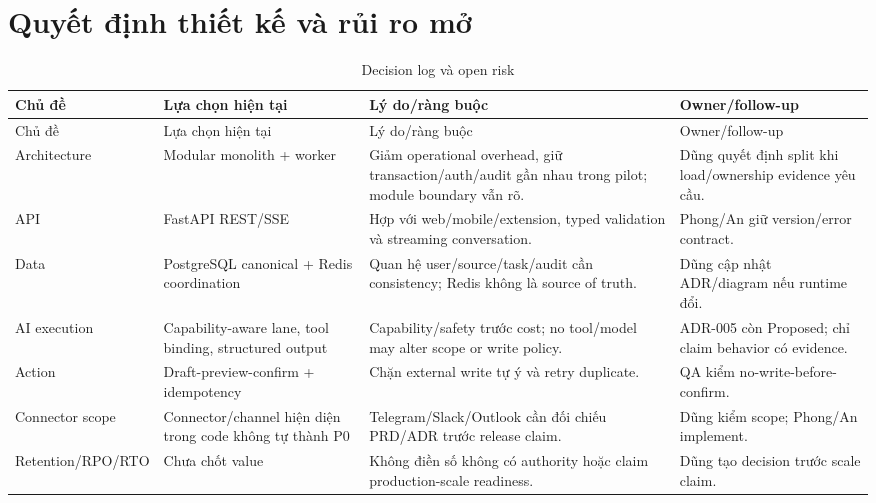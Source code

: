 \documentclass[12pt,a4paper]{article}
\begin{document}
\section{Quyết định thiết kế và rủi ro mở}
\begin{longtable}{p{3.0cm}p{3.4cm}p{5.1cm}p{3.0cm}}
\caption{Decision log và open risk}\label{tab:sdd-decision-log}\\
\toprule Chủ đề & Lựa chọn hiện tại & Lý do/ràng buộc & Owner/follow-up \\ \midrule
\endfirsthead
\toprule Chủ đề & Lựa chọn hiện tại & Lý do/ràng buộc & Owner/follow-up \\ \midrule
\endhead
Architecture & Modular monolith + worker & Giảm operational overhead, giữ transaction/auth/audit gần nhau trong pilot; module boundary vẫn rõ. & Dũng quyết định split khi load/ownership evidence yêu cầu. \\
API & FastAPI REST/SSE & Hợp với web/mobile/extension, typed validation và streaming conversation. & Phong/An giữ version/error contract. \\
Data & PostgreSQL canonical + Redis coordination & Quan hệ user/source/task/audit cần consistency; Redis không là source of truth. & Dũng cập nhật ADR/diagram nếu runtime đổi. \\
AI execution & Capability-aware lane, tool binding, structured output & Capability/safety trước cost; no tool/model may alter scope or write policy. & ADR-005 còn Proposed; chỉ claim behavior có evidence. \\
Action & Draft-preview-confirm + idempotency & Chặn external write tự ý và retry duplicate. & QA kiểm no-write-before-confirm. \\
Connector scope & Connector/channel hiện diện trong code không tự thành P0 & Telegram/Slack/Outlook cần đối chiếu PRD/ADR trước release claim. & Dũng kiểm scope; Phong/An implement. \\
Retention/RPO/RTO & Chưa chốt value & Không điền số không có authority hoặc claim production-scale readiness. & Dũng tạo decision trước scale claim. \\
\bottomrule
\end{longtable}
\end{document}
